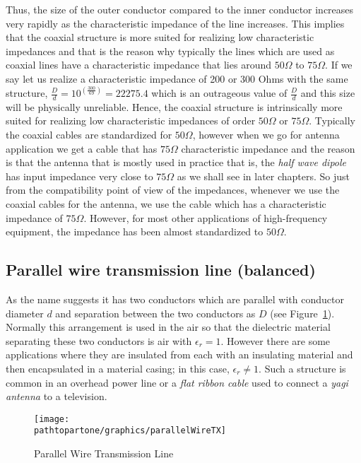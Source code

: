 Thus, the size of the outer conductor compared to the inner conductor increases very rapidly as the characteristic impedance of the line increases. This implies that the coaxial structure is more suited for realizing low characteristic impedances and that is the reason why typically the lines which are used as coaxial lines have a characteristic impedance that lies around $50\varOmega$ to $75\varOmega$. If we say let us realize a characteristic impedance of 200 or 300 Ohms with the same structure, $\frac{D}{d} = 10^{\left(\frac{300}{69}\right)} = 22275.4$ which is an outrageous value of $\frac{D}{d}$ and this size will be physically unreliable. Hence, the coaxial structure is intrinsically more suited for realizing low characteristic impedances of order $50\varOmega$ or $75\varOmega$. Typically the coaxial cables are standardized for $50\varOmega$, however when we go for antenna application we get a cable that has $75\varOmega$ characteristic impedance and the reason is that the antenna that is mostly used in practice that is, the \emph{half wave dipole} has input impedance very close to $75\varOmega$ as we shall see in later chapters. So just from the compatibility point of view of the impedances, whenever we use the coaxial cables for the antenna, we use the cable which has a characteristic impedance of $75\varOmega$. However, for most other applications of high-frequency equipment, the impedance has been almost standardized to $50\varOmega$.

\subsection{Parallel wire transmission line (balanced)} 
As the name suggests it has two conductors which are parallel with conductor diameter $d$ and separation between the two conductors as $D$ (see Figure~\ref{fig:parallelwiretx}). Normally this arrangement is used in the air so that the dielectric material separating these two conductors is air with $\epsilon_r=1$. However there are some applications where they are insulated from each with an insulating material and then encapsulated in a material casing; in this case, $\epsilon_r\neq1$. Such a structure is common in an overhead power line or a \emph{flat ribbon cable} used to connect a \emph{yagi antenna} to a television.
\begin{figure}[h]
\centering
\texttt{[image: \\pathtopartone/graphics/parallelWireTX]}
\caption{Parallel Wire Transmission Line}
\label{fig:parallelwiretx}
\end{figure}

